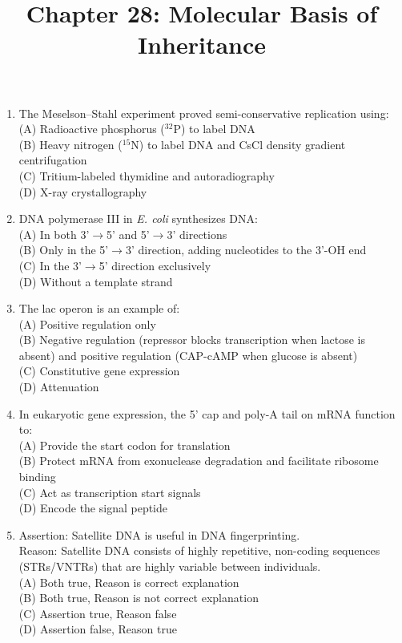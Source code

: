 \documentclass{article}
\begin{document}
\title{Chapter 28: Molecular Basis of Inheritance}
\date{}
\maketitle

\begin{enumerate}[label=Q\arabic*.]

\item The Meselson--Stahl experiment proved semi-conservative replication using:
\\(A) Radioactive phosphorus ($^{32}$P) to label DNA
\\(B) Heavy nitrogen ($^{15}$N) to label DNA and CsCl density gradient centrifugation
\\(C) Tritium-labeled thymidine and autoradiography
\\(D) X-ray crystallography

\item DNA polymerase III in \textit{E. coli} synthesizes DNA:
\\(A) In both 3'$\rightarrow$5' and 5'$\rightarrow$3' directions
\\(B) Only in the 5'$\rightarrow$3' direction, adding nucleotides to the 3'-OH end
\\(C) In the 3'$\rightarrow$5' direction exclusively
\\(D) Without a template strand

\item The lac operon is an example of:
\\(A) Positive regulation only
\\(B) Negative regulation (repressor blocks transcription when lactose is absent) and positive regulation (CAP-cAMP when glucose is absent)
\\(C) Constitutive gene expression
\\(D) Attenuation

\item In eukaryotic gene expression, the 5' cap and poly-A tail on mRNA function to:
\\(A) Provide the start codon for translation
\\(B) Protect mRNA from exonuclease degradation and facilitate ribosome binding
\\(C) Act as transcription start signals
\\(D) Encode the signal peptide

\item Assertion: Satellite DNA is useful in DNA fingerprinting.\\
Reason: Satellite DNA consists of highly repetitive, non-coding sequences (STRs/VNTRs) that are highly variable between individuals.
\\(A) Both true, Reason is correct explanation
\\(B) Both true, Reason is not correct explanation
\\(C) Assertion true, Reason false
\\(D) Assertion false, Reason true


\end{enumerate}
\end{document}
